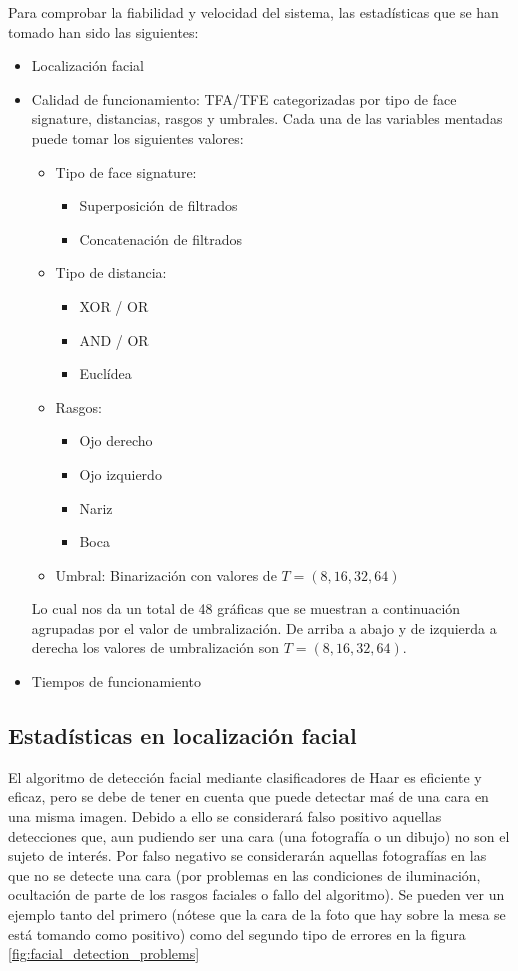 Para comprobar la fiabilidad y velocidad del sistema, las estadísticas que se han tomado han sido las siguientes:
\begin{itemize}
	\item{Localización facial}
	\item{Calidad de funcionamiento: TFA/TFE categorizadas por tipo de face signature, distancias, rasgos y umbrales. Cada una de las variables mentadas puede tomar los siguientes valores:
		\begin{itemize}
			\item{Tipo de face signature: 
				\begin{itemize}
					\item{Superposición de filtrados}
					\item{Concatenación de filtrados}
				\end{itemize}}
			\item{Tipo de distancia: 
				\begin{itemize}
					\item{XOR / OR}
					\item{AND / OR}
					\item{Euclídea}
				\end{itemize}}
			\item{Rasgos: 
				\begin{itemize}
					\item{Ojo derecho}
					\item{Ojo izquierdo}
					\item{Nariz}
					\item{Boca}
				\end{itemize}}
			\item{Umbral: Binarización con valores de $T=(8,16,32,64)$}
		\end{itemize}

	Lo cual nos da un total de 48 gráficas que se muestran a continuación agrupadas por el valor de umbralización. De arriba a abajo y de izquierda a derecha los valores de umbralización son $T=(8,16,32,64)$. 
	}
	\item{Tiempos de funcionamiento}

\end{itemize}

\subsection{Estadísticas en localización facial}
El algoritmo de detección facial mediante clasificadores de Haar es eficiente y eficaz, pero se debe de tener en cuenta que puede detectar maś de una cara en una misma imagen. Debido a ello se considerará falso positivo aquellas detecciones que, aun pudiendo ser una cara (una fotografía o un dibujo) no son el sujeto de interés. Por falso negativo se considerarán aquellas fotografías en las que no se detecte una cara (por problemas en las condiciones de iluminación, ocultación de parte de los rasgos faciales o fallo del algoritmo). Se pueden ver un ejemplo tanto del primero (nótese que la cara de la foto que hay sobre la mesa se está tomando como positivo) como del segundo tipo de errores en la figura \ref{fig:facial_detection_problems}

